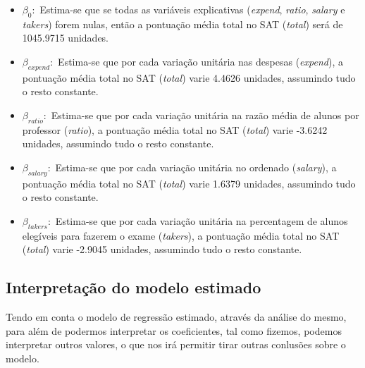 \documentclass[]{article}
\begin{document}
\begin{itemize}
  \item $\beta_0:$ Estima-se que se todas as variáveis explicativas (\textit{expend},
\textit{ratio}, \textit{salary} e \textit{takers}) forem nulas, então a pontuação
média total no SAT (\textit{total}) será de 1045.9715 unidades.
  
  \item $\beta_{expend}:$ Estima-se que por cada variação unitária nas despesas
(\textit{expend}), a pontuação média total no SAT (\textit{total}) varie 4.4626 unidades,
assumindo tudo o resto constante.
  
  \item $\beta_{ratio}:$ Estima-se que por cada variação unitária na razão média
de alunos por professor (\textit{ratio}), a pontuação média total no SAT
(\textit{total}) varie -3.6242 unidades, assumindo tudo o resto constante.
  
  \item $\beta_{salary}:$ Estima-se que por cada variação unitária no ordenado
(\textit{salary}), a pontuação média total no SAT (\textit{total}) varie 1.6379 unidades,
assumindo tudo o resto constante.
  
  \item $\beta_{takers}:$ Estima-se que por cada variação unitária na percentagem
de alunos elegíveis para fazerem o exame (\textit{takers}), a pontuação média total
no SAT (\textit{total}) varie -2.9045 unidades, assumindo tudo o resto constante.
\end{itemize}

\subsection{Interpretação do modelo estimado}

Tendo em conta o modelo de regressão estimado, através da análise do
mesmo, para além de podermos interpretar os coeficientes, tal como
fizemos, podemos interpretar outros valores, o que nos irá permitir
tirar outras conlusões sobre o modelo.

\begin{Shaded}
\begin{Highlighting}[]
\end{Highlighting}
\end{Shaded}
\end{document}
